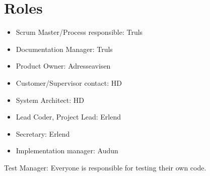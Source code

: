 \section{Roles}
\begin{itemize}
\item Scrum Master/Process responsible: Truls
\item Documentation Manager: Truls
\item Product Owner: Adresseavisen
\item Customer/Supervisor contact: HD
\item System Architect: HD
\item Lead Coder, Project Lead: Erlend
\item Secretary: Erlend
\item Implementation manager: Audun
\end{itemize}


Test Manager: Everyone is responsible for testing their own code.